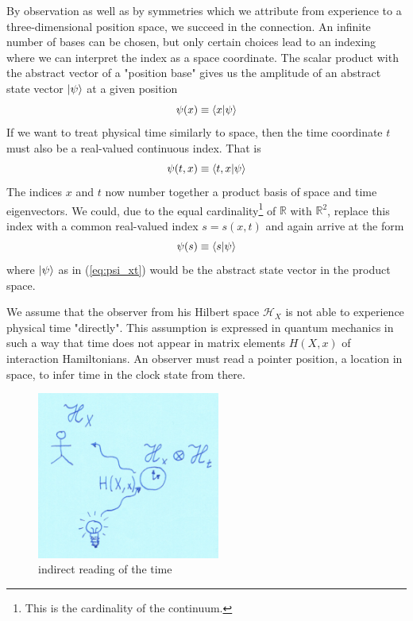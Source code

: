 \documentclass[12pt]{article}
\begin{document}
By observation as well as by symmetries which we attribute from experience to a three-dimensional position space, we succeed in the connection. An infinite number of bases can be chosen, but only certain choices lead to an indexing where we can interpret the index as a space coordinate. The scalar product with the abstract vector of a "position base" gives us the amplitude of an abstract state vector $\ket{\psi}$ at a given position
\begin{equation} 
\psi(x) \equiv \bra{x}\ket{\psi} 
\end{equation}
If we want to treat physical time similarly to space, then the time coordinate $t$ must also be a real-valued continuous index. That is
\begin{equation} 
\label{eq:psi_xt}
\psi(t,x) \equiv \bra{t,x}\ket{\psi} 
\end{equation}
The indices $x$ and $t$ now number together a product basis of space and time eigenvectors. We could, due to the equal cardinality\footnote{This is the cardinality of the continuum.} of $\mathbb{R}$ with $\mathbb{R}^2$, replace this index with a common real-valued index $s = s(x,t)$ and again arrive at the form
\begin{equation}
\label{eq:psi_s}
\psi(s) \equiv \bra{s}\ket{\psi} 
\end{equation}
where $\ket{\psi}$ as in (\ref{eq:psi_xt}) would be the abstract state vector in the product space.

We assume that the observer from his Hilbert space $\mathscr{H}_X$ is not able to experience physical time "directly". This assumption is expressed in quantum mechanics in such a way that time does not appear in matrix elements $H(X,x)$ of interaction Hamiltonians. An observer must read a pointer position, a location in space, to infer time in the clock state from there. 

\begin{figure}[!h]\begin{center}
  \includegraphics[width=6cm]{Quantenuhr.png}
  \caption{indirect reading of the time}
  \label{fig:clock}
\end{center}\end{figure}
\end{document}
